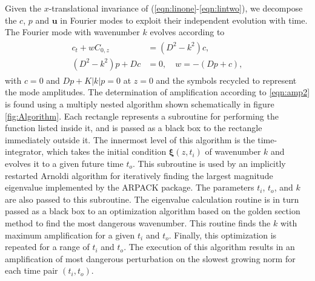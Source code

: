 \documentclass[letterpaper,prl,aps,twocolumn,reprint,superscriptaddress]{revtex4-1}
\newcommand{\bu}{\boldsymbol{u}}
\newcommand{\prt}{\boldsymbol{\xi}}
\newcommand{\obs}{o}
\newcommand{\inc}{i}
\begin{document}
Given the $x$-translational invariance of (\ref{eqn:linone}-\ref{eqn:lintwo}), we decompose the $c$, $p$ and $\bu$ in Fourier modes to exploit their independent evolution with time. 
The Fourier mode with wavenumber $k$ evolves according to
\begin{align}
\begin{split}
 c_t + w C_{0,z} &= (D^2-k^2) c,  \\
(D^2-k^2)p + Dc &= 0, \quad w = -(Dp + c),
\end{split}
\end{align}
with $c=0$ and $Dp + K|k| p =0$ at $z=0$ and the symbols recycled to represent the mode amplitudes. 
The determination of amplification according to \eqref{eqn:amp2} is found using a multiply nested algorithm shown schematically in figure \ref{fig:Algorithm}. 
Each rectangle represents a subroutine for performing the function listed inside it, and is passed as a black box to the rectangle immediately outside it.
The innermost level of this algorithm is the time-integrator, which takes the initial condition $\prt(z, t_\inc)$ of wavenumber $k$ and evolves it to a given future time $t_\obs$. 
This subroutine is used by an implicitly restarted Arnoldi algorithm for iteratively finding the largest magnitude eigenvalue implemented by the ARPACK package\cite{lehoucq1998arpack}. 
The parameters $t_\inc$, $t_\obs$, and $k$ are also passed to this subroutine. 
The eigenvalue calculation routine is in turn passed as a black box to an optimization algorithm based on the golden section method to find the most dangerous wavenumber. 
This routine finds the $k$ with maximum amplification for a given $t_\inc$ and $t_\obs$. 
Finally, this optimization is repeated for a range of $t_\inc$ and $t_\obs$. 
The execution of this algorithm results in an amplification of most dangerous perturbation on the slowest growing norm for each time pair $(t_\inc, t_\obs)$. 
\end{document}
